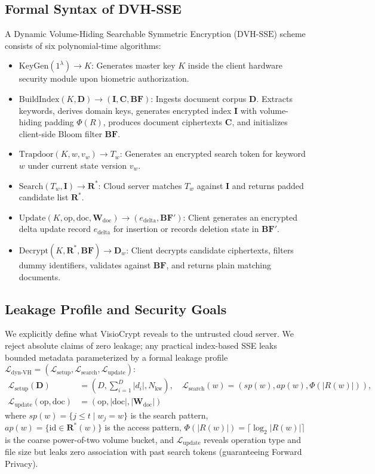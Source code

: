 \documentclass[10pt,conference]{IEEEtran}
\begin{document}
\subsection{Formal Syntax of DVH-SSE}
A Dynamic Volume-Hiding Searchable Symmetric Encryption ($\text{DVH-SSE}$) scheme consists of six polynomial-time algorithms:
\begin{itemize}
    \item $\text{KeyGen}(1^\lambda) \to K$: Generates master key $K$ inside the client hardware security module upon biometric authorization.
    \item $\text{BuildIndex}(K, \mathbf{D}) \to (\mathbf{I}, \mathbf{C}, \mathbf{BF})$: Ingests document corpus $\mathbf{D}$. Extracts keywords, derives domain keys, generates encrypted index $\mathbf{I}$ with volume-hiding padding $\Phi(R)$, produces document ciphertexts $\mathbf{C}$, and initializes client-side Bloom filter $\mathbf{BF}$.
    \item $\text{Trapdoor}(K, w, v_w) \to T_w$: Generates an encrypted search token for keyword $w$ under current state version $v_w$.
    \item $\text{Search}(T_w, \mathbf{I}) \to \mathbf{R}^*$: Cloud server matches $T_w$ against $\mathbf{I}$ and returns padded candidate list $\mathbf{R}^*$.
    \item $\text{Update}(K, \text{op}, \text{doc}, \mathbf{W}_{\text{doc}}) \to (e_{\text{delta}}, \mathbf{BF}')$: Client generates an encrypted delta update record $e_{\text{delta}}$ for insertion or records deletion state in $\mathbf{BF}'$.
    \item $\text{Decrypt}(K, \mathbf{R}^*, \mathbf{BF}) \to \mathbf{D}_w$: Client decrypts candidate ciphertexts, filters dummy identifiers, validates against $\mathbf{BF}$, and returns plain matching documents.
\end{itemize}

\subsection{Leakage Profile and Security Goals}
We explicitly define what VisioCrypt reveals to the untrusted cloud server. We reject absolute claims of zero leakage; any practical index-based SSE leaks bounded metadata parameterized by a formal leakage profile $\mathcal{L}_{\text{dyn-VH}} = (\mathcal{L}_{\text{setup}}, \mathcal{L}_{\text{search}}, \mathcal{L}_{\text{update}})$:
\begin{align}
\mathcal{L}_{\text{setup}}(\mathbf{D}) &= (D, \textstyle\sum_{i=1}^D |d_i|, N_{\text{kw}}), \quad
\mathcal{L}_{\text{search}}(w) = (sp(w), ap(w), \Phi(|R(w)|)), \nonumber \\
\mathcal{L}_{\text{update}}(\text{op}, \text{doc}) &= (\text{op}, |\text{doc}|, |\mathbf{W}_{\text{doc}}|)
\end{align}
where $sp(w) = \{ j \le t \mid w_j = w \}$ is the search pattern, $ap(w) = \{ \text{id} \in \mathbf{R}^*(w) \}$ is the access pattern, $\Phi(|R(w)|) = \lceil \log_2 |R(w)| \rceil$ is the coarse power-of-two volume bucket, and $\mathcal{L}_{\text{update}}$ reveals operation type and file size but leaks zero association with past search tokens (guaranteeing Forward Privacy).
\end{document}
